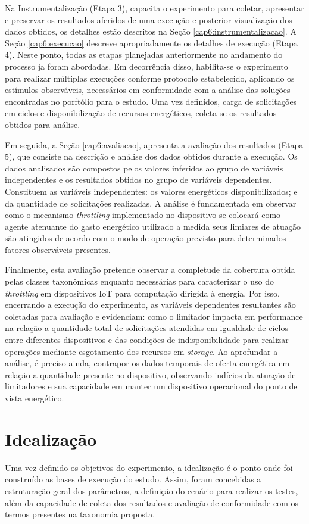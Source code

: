 Na Instrumentalização (Etapa 3), capacita o experimento para coletar, apresentar e preservar os resultados aferidos de uma execução e posterior visualização dos dados obtidos, os detalhes estão descritos na Seção \ref{cap6:instrumentalizacao}. A Seção \ref{cap6:execucao} descreve apropriadamente os detalhes de execução (Etapa 4). Neste ponto, todas as etapas planejadas anteriormente no andamento do processo ja foram abordadas. Em decorrência disso, habilita-se o experimento para realizar múltiplas execuções conforme protocolo estabelecido, aplicando os estímulos observáveis, necessários em conformidade com a análise das soluções encontradas no porftólio para o estudo. Uma vez definidos, carga de solicitações em ciclos e disponibilização de recursos energéticos, coleta-se os resultados obtidos para análise.

Em seguida, a Seção \ref{cap6:avaliacao}, apresenta a avaliação dos resultados (Etapa 5), que consiste na descrição e análise dos dados obtidos durante a execução. Os dados analisados são compostos pelos valores inferidos ao grupo de variáveis independentes e os resultados obtidos no grupo de variáveis dependentes. Constituem as variáveis independentes: os valores energéticos disponibilizados; e da quantidade de solicitações realizadas. A análise é fundamentada em observar como o mecanismo \textit{throttling} implementado no dispositivo se colocará como agente atenuante do gasto energético utilizado a medida seus limiares de atuação são atingidos de acordo com o modo de operação previsto para determinados fatores observáveis presentes. 

Finalmente, esta avaliação pretende observar a completude da cobertura obtida pelas classes taxonômicas enquanto necessárias para caracterizar o uso do \textit{throttling} em dispositivos \acs{IoT} para computação dirigida à energia. Por isso, encerrando a execução do experimento, as variáveis dependentes resultantes são coletadas para avaliação e evidenciam: como o limitador impacta em performance na relação a quantidade total de solicitações atendidas em igualdade de ciclos entre diferentes dispositivos e das  condições de indisponibilidade para realizar operações mediante esgotamento dos recursos em \textit{storage}.  Ao aprofundar a análise, é preciso ainda, contrapor os dados temporais de oferta energética em relação a quantidade presente no dispositivo, observando indícios da atuação de limitadores e sua capacidade em manter um dispositivo operacional do ponto de vista energético.


\section{Idealização}
\label{cap6:idealizacao}
Uma vez definido os objetivos do experimento, a idealização é o ponto onde foi construído as bases de execução do estudo. Assim, foram concebidas a estruturação geral dos parâmetros, a  definição do cenário para realizar os testes, além da capacidade de coleta dos resultados e avaliação de conformidade com os termos presentes na taxonomia proposta.

